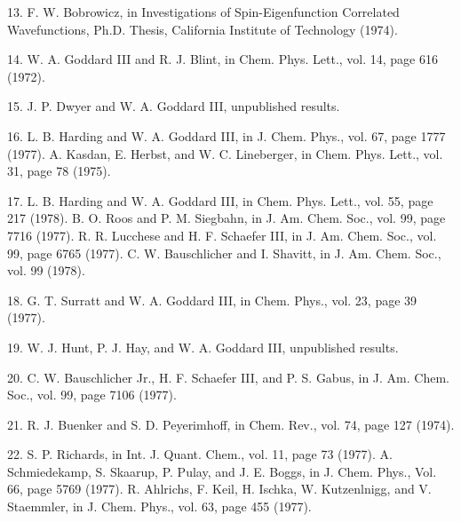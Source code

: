 \item {13.} F. W. Bobrowicz, in Investigations of Spin-Eigenfunction 
Correlated Wavefunctions, Ph.D. Thesis, California Institute of 
Technology (1974).

\item {14.} W. A. Goddard III and R. J. Blint, in Chem. Phys. Lett., 
vol. 14, page 616 (1972).

\item {15.} J. P. Dwyer and W. A. Goddard III, unpublished results.

\item {16.} L. B. Harding and W. A. Goddard III, in J. Chem. Phys., vol. 
67, page 1777 (1977).  A. Kasdan, E. Herbst, and W. C. Lineberger, in 
Chem. Phys. Lett., vol. 31, page 78 (1975).

\item {17.} L. B. Harding and W. A. Goddard III, in Chem. Phys. Lett., 
vol. 55, page 217 (1978).  B. O. Roos and P. M. Siegbahn, in J. Am. 
Chem. Soc., vol. 99, page 7716 (1977).  R. R. Lucchese and H. F. 
Schaefer III, in J. Am. Chem. Soc., vol. 99, page 6765 (1977).  C. W. 
Bauschlicher and I. Shavitt, in J. Am. Chem. Soc., vol. 99 (1978).

\item {18.} G. T. Surratt and W. A. Goddard III, in Chem. Phys., vol. 
23, page 39 (1977).

\item {19.} W. J. Hunt, P. J. Hay, and W. A. Goddard III, unpublished 
results.

\item {20.} C. W. Bauschlicher Jr., H. F. Schaefer III, and P. S. 
Gabus, in J. Am. Chem. Soc., vol. 99, page 7106 (1977).

\item {21.}	R. J. Buenker and S. D. Peyerimhoff, in Chem. Rev., vol. 74, 
page 127 (1974).

\item {22.}	S. P. Richards, in Int. J. Quant. Chem., vol. 11, page 
73 (1977).  A. Schmiedekamp, S. Skaarup, P. Pulay, and J. E. Boggs, 
in J. Chem. Phys., Vol. 66, page 5769 (1977).  R. Ahlrichs, F. Keil, 
H. Ischka, W. Kutzenlnigg, and V. Staemmler, in J. Chem. Phys., vol. 
63, page 455 (1977).
\vfill\eject

